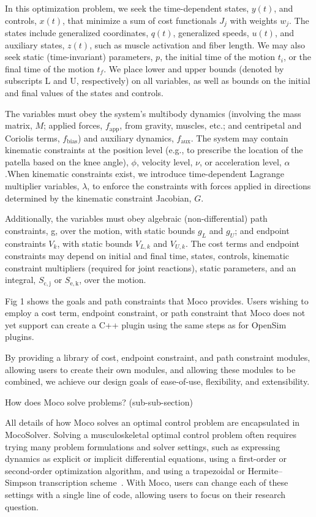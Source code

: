 \documentclass[10pt,letterpaper]{article}
\begin{document}
In this optimization problem, we seek the time-dependent states, $y(t)$, and controls, $x(t)$, that minimize a sum of cost functionals $J_j$ with weights $w_j$. The states include generalized coordinates, $q(t)$, generalized speeds, $u(t)$, and auxiliary states, $z(t)$, such as muscle activation and fiber length. We may also seek static (time-invariant) parameters, $p$, the initial time of the motion $t_i$, or the final time of the motion $t_f$. We place lower and upper bounds (denoted by subscripts L and U, respectively) on all variables, as well as bounds on the initial and final values of the states and controls.

The variables must obey the system’s multibody dynamics (involving the mass matrix, $M$; applied forces, $f_\mathrm{app}$, from gravity, muscles, etc.; and centripetal and Coriolis terms, $f_\mathrm{bias}$) and auxiliary dynamics, $f_\mathrm{aux}$. The system may contain kinematic constraints at the position level (e.g., to prescribe the location of the patella based on the knee angle), $\phi$, velocity level, $\nu$, or acceleration level, $\alpha$.When kinematic constraints exist, we introduce time-dependent Lagrange multiplier variables, $\lambda$, to enforce the constraints with forces applied in directions determined by the kinematic constraint Jacobian, $G$.

Additionally, the variables must obey algebraic (non-differential) path constraints, g, over the motion, with static bounds $g_L$ and $g_U$; and endpoint constraints $V_k$, with static bounds $V_{L,k}$ and $V_{U,k}$. The cost terms and endpoint constraints may depend on initial and final time, states, controls, kinematic constraint multipliers (required for joint reactions), static parameters, and an integral, $S_\mathrm{c,j}$ or $S_\mathrm{e,k}$, over the motion.

Fig 1 shows the goals and path constraints that Moco provides. Users wishing to employ a cost term, endpoint constraint, or path constraint that Moco does not yet support can create a C++ plugin using the same steps as for OpenSim plugins.

By providing a library of cost, endpoint constraint, and path constraint modules, allowing users to create their own modules, and allowing these modules to be combined, we achieve our design goals of ease-of-use, flexibility, and extensibility.

How does Moco solve problems? (sub-sub-section)

All details of how Moco solves an optimal control problem are encapsulated in MocoSolver. Solving a musculoskeletal optimal control problem often requires trying many problem formulations and solver settings, such as expressing dynamics as explicit or implicit differential equations, using a first-order or second-order optimization algorithm, and using a trapezoidal or Hermite–Simpson transcription scheme~\cite{Betts:2010}. With Moco, users can change each of these settings with a single line of code, allowing users to focus on their research question.
\end{document}
